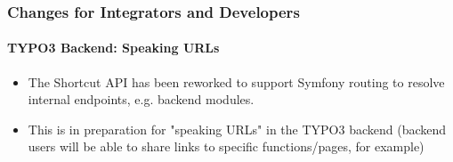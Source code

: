 %

\begin{frame}[fragile]
	\frametitle{Changes for Integrators and Developers}
	\framesubtitle{TYPO3 Backend: Speaking URLs}

	\begin{itemize}
		\item The Shortcut API has been reworked to support Symfony routing to
			resolve internal endpoints, e.g. backend modules.
		\item This is in preparation for "speaking URLs" in the TYPO3 backend\newline
			\small(backend users will be able to share links to specific functions/pages,
			for example)\normalsize

	\end{itemize}

\end{frame}

